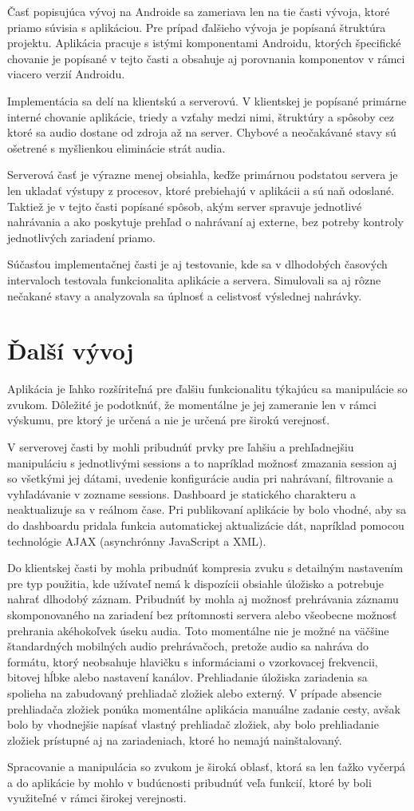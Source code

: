 Časť popisujúca vývoj na Androide sa zameriava len na tie časti vývoja, ktoré priamo súvisia s aplikáciou. Pre prípad ďalšieho vývoja je popísaná štruktúra projektu. Aplikácia pracuje s istými komponentami Androidu, ktorých špecifické chovanie je popísané v tejto časti a obsahuje aj porovnania komponentov v rámci viacero verzií Androidu.

Implementácia sa delí na klientskú a serverovú. V klientskej je popísané primárne interné chovanie aplikácie, triedy a vzťahy medzi nimi, štruktúry a spôsoby cez ktoré sa audio dostane od zdroja až na server. Chybové a neočakávané stavy sú ošetrené s myšlienkou eliminácie strát audia. 

Serverová časť je výrazne menej obsiahla, keďže primárnou podstatou servera je len ukladať výstupy z procesov, ktoré prebiehajú v aplikácii a sú naň odoslané. Taktiež je v tejto časti popísané spôsob, akým server spravuje jednotlivé nahrávania a ako poskytuje prehľad o nahrávaní aj externe, bez potreby kontroly jednotlivých zariadení priamo.

Súčasťou implementačnej časti je aj testovanie, kde sa v dlhodobých časových intervaloch testovala funkcionalita aplikácie a servera. Simulovali sa aj rôzne nečakané stavy a analyzovala sa úplnosť a celistvosť výslednej nahrávky. 

\section{Ďalší vývoj}

Aplikácia je ľahko rozšíriteľná pre ďalšiu funkcionalitu týkajúcu sa manipulácie so zvukom. Dôležité je podotknúť, že momentálne je jej zameranie len v rámci výskumu, pre ktorý je určená a nie je určená pre širokú verejnosť. 

V serverovej časti by mohli pribudnúť prvky pre ľahšiu a prehľadnejšiu manipuláciu s jednotlivými sessions a to napríklad možnosť zmazania session aj so všetkými jej dátami, uvedenie konfigurácie audia pri nahrávaní, filtrovanie a vyhľadávanie v zozname sessions. Dashboard je statického charakteru a neaktualizuje sa v reálnom čase. Pri publikovaní aplikácie by bolo vhodné, aby sa do dashboardu pridala funkcia automatickej aktualizácie dát, napríklad pomocou technológie AJAX (asynchrónny JavaScript a XML). 

Do klientskej časti by mohla pribudnúť kompresia zvuku s detailným nastavením pre typ použitia, kde užívateľ nemá k dispozícii obsiahle úložisko a potrebuje nahrať dlhodobý záznam. Pribudnúť by mohla aj možnosť prehrávania záznamu skomponovaného na zariadení bez prítomnosti servera alebo všeobecne možnosť prehrania akéhokoľvek úseku audia. Toto momentálne nie je možné na väčšine štandardných mobilných audio prehrávačoch, pretože audio sa nahráva do formátu, ktorý neobsahuje hlavičku s informáciami o vzorkovacej frekvencii, bitovej hĺbke alebo nastavení kanálov. Prehliadanie úložiska zariadenia sa spolieha na zabudovaný prehliadač zložiek alebo externý. V prípade absencie prehliadača zložiek ponúka momentálne aplikácia manuálne zadanie cesty, avšak bolo by vhodnejšie napísať vlastný prehliadač zložiek, aby bolo prehliadanie zložiek prístupné aj na zariadeniach, ktoré ho nemajú nainštalovaný.

Spracovanie a manipulácia so zvukom je široká oblasť, ktorá sa len ťažko vyčerpá a do aplikácie by mohlo v budúcnosti pribudnúť veľa funkcií, ktoré by boli využiteľné v rámci širokej verejnosti.


